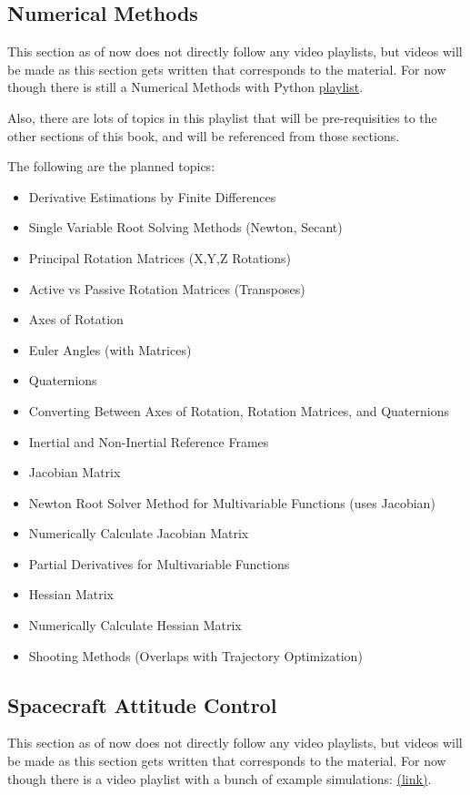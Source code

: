 \documentclass{article}
\begin{document}
\clearpage

\subsection{Numerical Methods}
This section as of now does not directly follow any video playlists, but videos will be made as this section gets written that corresponds to the material. For now though there is still a Numerical Methods with Python \color{cyan}\href{https://www.youtube.com/playlist?list=PLOIRBaljOV8gMqhggseSHI9u2pldGZonA}{playlist}\color{white}.


\noindent
Also, there are lots of topics in this playlist that will be pre-requisities to the other sections of this book, and will be referenced from those sections.


\noindent
The following are the planned topics:

\begin{itemize}
	\item Derivative Estimations by Finite Differences
	\item Single Variable Root Solving Methods (Newton, Secant)
	\item Principal Rotation Matrices (X,Y,Z Rotations)
	\item Active vs Passive Rotation Matrices (Transposes)
	\item Axes of Rotation
	\item Euler Angles (with Matrices)
	\item Quaternions
	\item Converting Between Axes of Rotation, Rotation Matrices, and Quaternions
	\item Inertial and Non-Inertial Reference Frames
	\item Jacobian Matrix
	\item Newton Root Solver Method for Multivariable Functions (uses Jacobian)
	\item Numerically Calculate Jacobian Matrix
	\item Partial Derivatives for Multivariable Functions
	\item Hessian Matrix
	\item Numerically Calculate Hessian Matrix
	\item Shooting Methods (Overlaps with Trajectory Optimization)
\end{itemize}


\clearpage

\subsection{Spacecraft Attitude Control}
This section as of now does not directly follow any video playlists, but videos will be made as this section gets written that corresponds to the material. For now though there is a video playlist with a bunch of example simulations: \color{cyan}\href{https://www.youtube.com/playlist?list=PLOIRBaljOV8gMqhggseSHI9u2pldGZonA}{(link)}\color{white}.
\end{document}
